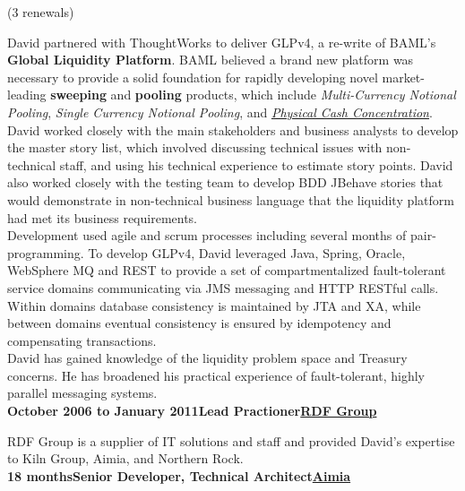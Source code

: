 \documentclass[a4paper,12pt]{article}
\newcommand{\clientwork}[3]{\textbf{#1\hfill#3\hfill#2}\nopagebreak}
\newcommand{\renewals}[2]{(#2)\nopagebreak}
\begin{document}
\renewals{15 months}{3 renewals}


David partnered with ThoughtWorks to deliver GLPv4, a re-write of BAML's \textbf{Global Liquidity Platform}. BAML believed a brand new platform was necessary to provide a solid foundation for rapidly developing novel market-leading \textbf{sweeping} and \textbf{pooling} products, which include \emph{Multi-Currency Notional Pooling}, \emph{Single Currency Notional Pooling}, and \emph{\href{http://www.marketwatch.com/story/bank-of-america-merrill-lynch-adds-physical-cash-concentration-to-global-liquidity-platform-2012-03-19}{Physical Cash Concentration}}.\\

David worked closely with the main stakeholders and business analysts to develop the master story list, which involved discussing technical issues with non-technical staff, and using his technical experience to estimate story points. David also worked closely with the testing team to develop BDD JBehave stories that would demonstrate in non-technical business language that the liquidity platform had met its business requirements.\\

Development used agile and scrum processes including several months of pair-programming. To develop GLPv4, David leveraged Java, Spring, Oracle, WebSphere MQ and REST to provide a set of compartmentalized fault-tolerant service domains communicating via JMS messaging and HTTP RESTful calls. Within domains database consistency is maintained by JTA and XA, while between domains eventual consistency is ensured by idempotency and compensating transactions.\\

David has gained knowledge of the liquidity problem space and Treasury concerns. He has broadened his practical experience of fault-tolerant, highly parallel messaging systems.\\

\clientwork{October 2006 to January 2011}{\href{http://www.rdfgroup.com/}{RDF Group}}{Lead Practioner}

RDF Group is a supplier of IT solutions and staff and provided David's expertise to Kiln Group, Aimia, and Northern Rock.\\

\clientwork{18 months}{\href{http://www.aimia.com/}{Aimia}}{Senior Developer, Technical Architect}
\end{document}
